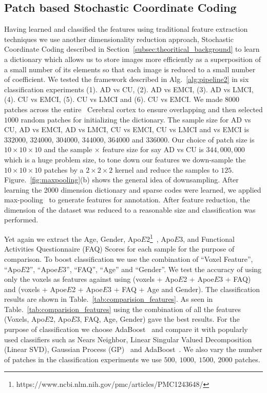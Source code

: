\subsection{Patch based  Stochastic Coordinate Coding}
\label{subsec:patch_based_scc}
Having learned and classified the features using traditional feature extraction techniques we use another dimensionality reduction approach, Stochastic Coordinate Coding described in Section~\ref{subsec:theoritical_background} to learn a dictionary which allows us to store images more efficiently as a superposition of a small number of its elements so that each image is reduced to a small number of coefficient. 
We tested the framework described in Alg.~\ref{alg:pipeline2} in six classification experiments (1). AD vs CU, (2). AD vs EMCI, (3). AD vs LMCI, (4). CU vs EMCI, (5). CU vs LMCI and (6). CU vs EMCI. We made $ 8000 $ patches across the entire \FDGPET~Cerebral cortex to ensure overlapping and then selected $ 1000 $ random patches for initializing the dictionary. The sample size for AD vs CU, AD vs EMCI, AD vs LMCI, CU vs EMCI, CU vs LMCI and  vs EMCI is $ 332000 $, $ 324000 $, $ 304000 $, $ 344000 $,  $ 364000 $ and $ 336000 $. Our choice of patch size is $ 10\times 10\times 10 $ and the sample $ \times $ feature size for say AD vs CU is $ 344,000,000 $ which is a huge problem size, to tone down our features we down-sample the $ 10\times 10\times 10 $ patches by a $ 2\times 2\times 2 $ kernel and reduce the samples to $ 125 $. Figure.~\ref{fig:maxpooling}(b) shows the general idea of downsampling. After learning the 2000 dimension dictionary and sparse codes were learned, we applied max-pooling~\citep{scherer2010evaluation} to generate features for annotation. After feature reduction, the dimension of the dataset was reduced to a reasonable size and classification was performed.

Yet again we extract the Age, Gender, Apo$E$2\footnote{https://www.ncbi.nlm.nih.gov/pmc/articles/PMC1243648/}~\citep{ghebranious2005detection,genin2011apoe}, Apo$E$3, and Functional Activities Questionnaire (FAQ) Scores for each sample for the purpose of comparison. To boost classification we use the combination of ``Voxel Feature'', ``Apo$E$2'', ``Apoe$E$3'', ``FAQ'', ``Age'' and ``Gender''. We test the accuracy of using only the voxels as features against using (voxels + Apo$ E $2 + Apoe$E$3 + FAQ) and (voxels + Apoe$E$2 + Apoe$ E $3 + FAQ + Age and Gender). The classification results are shown in Table.~\ref{tab:comparision_features}.
As seen in  Table.~\ref{tab:comparision_features} using the combination of all the features (Voxels, Apo$E$2, Apo$E$3, FAQ, Age, Gender) gave the best results.
For the purpose of classification we choose AdaBoost~\citep*{shawe2004kernel} and compare it with popularly used classifiers such as Nears Neighbor, Linear Singular Valued Decomposition (Linear SVD), Gaussian Process (GP)~\citep{rasmussen2006gaussian} and AdaBoost~\citep{rojas2009adaboost}. 
We also vary the number of patches in the classification experiments we use $ 500,~1000,~1500,~2000$ patches. 


